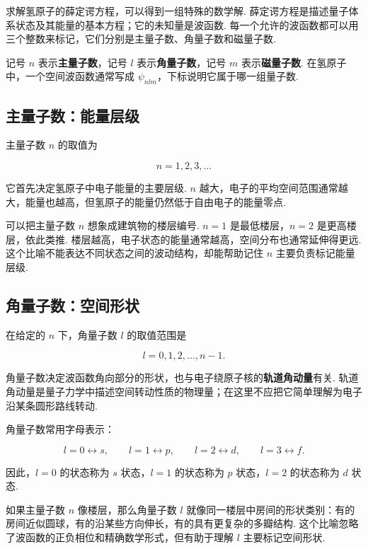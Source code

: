 \documentclass[UTF8,11pt,a4paper,openany]{ctexbook}
\newcommand{\term}[1]{\textbf{#1}}
\begin{document}
求解氢原子的薛定谔方程，可以得到一组特殊的数学解. 薛定谔方程是描述量子体系状态及其能量的基本方程；它的未知量是波函数. 每一个允许的波函数都可以用三个整数来标记，它们分别是主量子数、角量子数和磁量子数. 

\begin{notationbox}
记号 $n$ 表示\term{主量子数}，记号 $l$ 表示\term{角量子数}，记号 $m$ 表示\term{磁量子数}. 在氢原子中，一个空间波函数通常写成 $\psi_{n l m}$，下标说明它属于哪一组量子数. 
\end{notationbox}

\subsection{主量子数：能量层级}

主量子数 $n$ 的取值为

\[
n=1,2,3,\ldots
\]

它首先决定氢原子中电子能量的主要层级. $n$ 越大，电子的平均空间范围通常越大，能量也越高，但氢原子的能量仍然低于自由电子的能量零点. 

\begin{analogybox}
可以把主量子数 $n$ 想象成建筑物的楼层编号. $n=1$ 是最低楼层，$n=2$ 是更高楼层，依此类推. 楼层越高，电子状态的能量通常越高，空间分布也通常延伸得更远. 这个比喻不能表达不同状态之间的波动结构，却能帮助记住 $n$ 主要负责标记能量层级. 
\end{analogybox}

\subsection{角量子数：空间形状}

在给定的 $n$ 下，角量子数 $l$ 的取值范围是

\[
l=0,1,2,\ldots,n-1.
\]

角量子数决定波函数角向部分的形状，也与电子绕原子核的\term{轨道角动量}有关. 轨道角动量是量子力学中描述空间转动性质的物理量；在这里不应把它简单理解为电子沿某条圆形路线转动. 

角量子数常用字母表示：

\[
l=0\longleftrightarrow s,\qquad
l=1\longleftrightarrow p,\qquad
l=2\longleftrightarrow d,\qquad
l=3\longleftrightarrow f.
\]

因此，$l=0$ 的状态称为 $s$ 状态，$l=1$ 的状态称为 $p$ 状态，$l=2$ 的状态称为 $d$ 状态. 

\begin{analogybox}
如果主量子数 $n$ 像楼层，那么角量子数 $l$ 就像同一楼层中房间的形状类别：有的房间近似圆球，有的沿某些方向伸长，有的具有更复杂的多瓣结构. 这个比喻忽略了波函数的正负相位和精确数学形式，但有助于理解 $l$ 主要标记空间形状. 
\end{analogybox}
\end{document}
